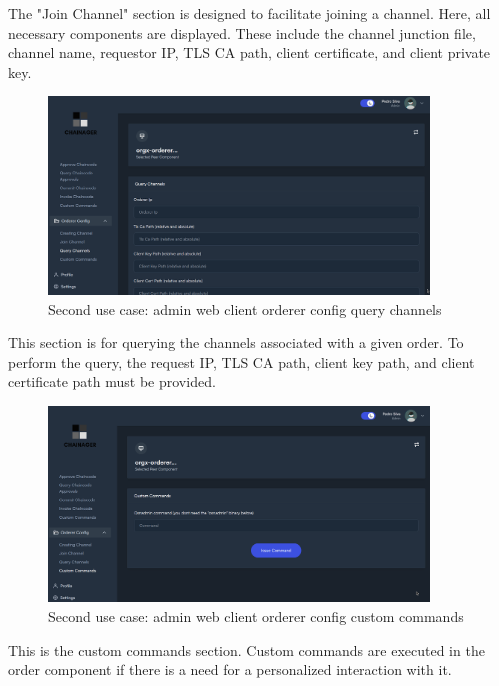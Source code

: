 The "Join Channel" section is designed to facilitate joining a channel. Here, all necessary components are displayed. These include the channel junction file, channel name, requestor IP, TLS CA path, client certificate, and client private key.

\begin{figure}[H]
    \centering
    \includegraphics[width=0.9\textwidth]{assets/use-case-2/orderer-config-query-channels.png} %
    \caption{Second use case: admin web client orderer config query channels}
    \label{fig:sample-image} 
\end{figure}

This section is for querying the channels associated with a given order. To perform the query, the request IP, TLS CA path, client key path, and client certificate path must be provided.

\begin{figure}[H]
    \centering
    \includegraphics[width=0.9\textwidth]{assets/use-case-2/orderer-config-custom-commands.png} %
    \caption{Second use case: admin web client orderer config custom commands}
    \label{fig:sample-image} 
\end{figure}

This is the custom commands section. Custom commands are executed in the order component if there is a need for a personalized interaction with it.

